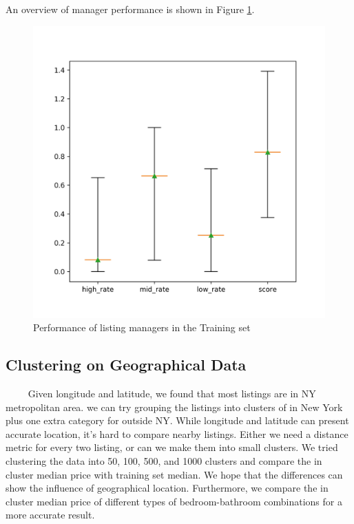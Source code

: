 \documentclass{article}
\begin{document}
An overview of manager performance is shown in Figure \ref{mngr_skill}.
\begin{figure}[htbp]
\centering
    \includegraphics[scale=0.4]{pic/manager_skill.png} 
    \caption{Performance of listing managers in the Training set} \label{mngr_skill}
\end{figure}

\subsection{Clustering on Geographical Data}

~~~~ Given longitude and latitude, we found that most listings are in NY metropolitan area. 
we can try grouping the listings into clusters of in New York plus one extra category for outside NY. While longitude and latitude can present accurate location, it's hard to compare nearby listings. Either we need a distance metric for every two listing, or can we make them into small clusters. We tried clustering the data into 50, 100, 500, and 1000 clusters and compare the in cluster median price with training set median. We hope that the differences can show the influence of geographical location. Furthermore, we compare the in cluster median price of different types of bedroom-bathroom combinations for a more accurate result. 
\end{document}
